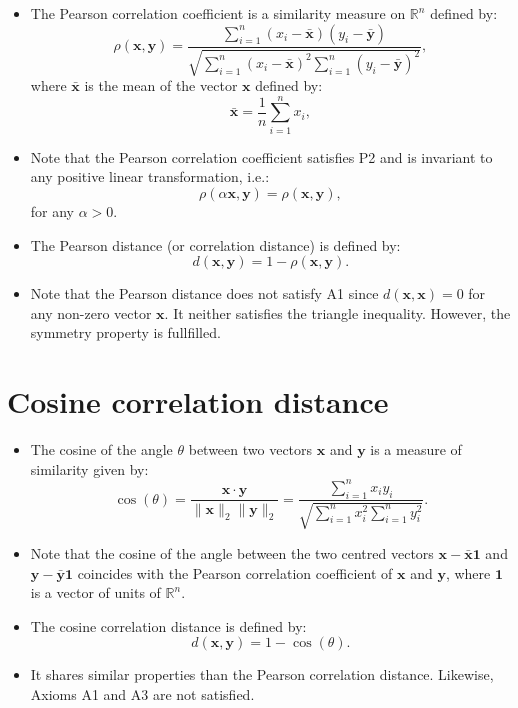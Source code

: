 \documentclass[
]{article}
\providecommand{\tightlist}{%
  \setlength{\itemsep}{0pt}\setlength{\parskip}{0pt}}
\begin{document}
\begin{itemize}
\item
  The Pearson correlation coefficient is a similarity measure on
  \(\mathbb{R}^n\) defined by: \[
  \rho(\mathbf{x},\mathbf{y})=
  \frac{\sum_{i=1}^n (x_i-\bar{\mathbf{x}})(y_i-\bar{\mathbf{y}})}{{\sqrt{\sum_{i=1}^n (x_i-\bar{\mathbf{x}})^2\sum_{i=1}^n (y_i-\bar{\mathbf{y}})^2}}},
  \] where \(\bar{\mathbf{x}}\) is the mean of the vector \(\mathbf{x}\)
  defined by: \[\bar{\mathbf{x}}=\frac{1}{n}\sum_{i=1}^n x_i,\]
\item
  Note that the Pearson correlation coefficient satisfies P2 and is
  invariant to any positive linear transformation, i.e.:
  \[\rho(\alpha\mathbf{x},\mathbf{y})=\rho(\mathbf{x},\mathbf{y}),\] for
  any \(\alpha>0\).
\item
  The Pearson distance (or correlation distance) is defined by: \[
  d(\mathbf{x},\mathbf{y})=1-\rho(\mathbf{x},\mathbf{y}).\]
\item
  Note that the Pearson distance does not satisfy A1 since
  \(d(\mathbf{x},\mathbf{x})=0\) for any non-zero vector \(\mathbf{x}\).
  It neither satisfies the triangle inequality. However, the symmetry
  property is fullfilled.
\end{itemize}

\hypertarget{cosine-correlation-distance}{%
\section{Cosine correlation
distance}\label{cosine-correlation-distance}}

\begin{itemize}
\tightlist
\item
  The cosine of the angle \(\theta\) between two vectors \(\mathbf{x}\)
  and \(\mathbf{y}\) is a measure of similarity given by: \[
  \cos(\theta)=\frac{\mathbf{x}\cdot \mathbf{y}}{\|\mathbf{x}\|_2\|\mathbf{y}\|_2}=\frac{\sum_{i=1}^n x_i y_i}{{\sqrt{\sum_{i=1}^n x_i^2\sum_{i=1}^n y_i^2}}}.
  \]
\item
  Note that the cosine of the angle between the two centred vectors
  \(\mathbf{x}-\bar{\mathbf{x}}\mathbf{1}\) and
  \(\mathbf{y}-\bar{\mathbf{y}}\mathbf{1}\) coincides with the Pearson
  correlation coefficient of \(\mathbf{x}\) and \(\mathbf{y}\), where
  \(\mathbf{1}\) is a vector of units of \(\mathbb{R}^n\).
\item
  The cosine correlation distance is defined by: \[
  d(\mathbf{x},\mathbf{y})=1-\cos(\theta).
  \]
\item
  It shares similar properties than the Pearson correlation distance.
  Likewise, Axioms A1 and A3 are not satisfied.
\end{itemize}
\end{document}
